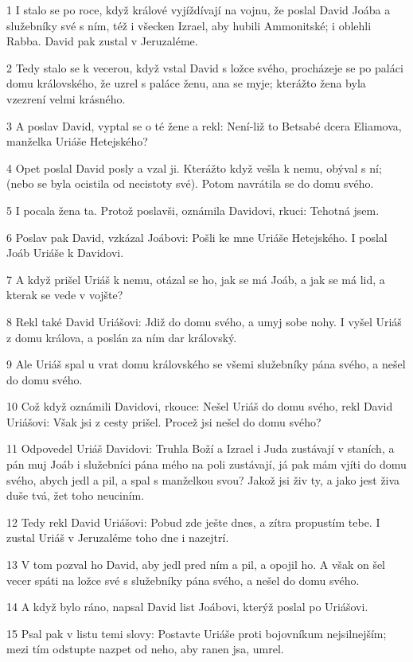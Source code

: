 \par 1 I stalo se po roce, když králové vyjíždívají na vojnu, že poslal David Joába a služebníky své s ním, též i všecken Izrael, aby hubili Ammonitské; i oblehli Rabba. David pak zustal v Jeruzaléme.
\par 2 Tedy stalo se k vecerou, když vstal David s ložce svého, procházeje se po paláci domu královského, že uzrel s paláce ženu, ana se myje; kterážto žena byla vzezrení velmi krásného.
\par 3 A poslav David, vyptal se o té žene a rekl: Není-liž to Betsabé dcera Eliamova, manželka Uriáše Hetejského?
\par 4 Opet poslal David posly a vzal ji. Kterážto když vešla k nemu, obýval s ní; (nebo se byla ocistila od necistoty své). Potom navrátila se do domu svého.
\par 5 I pocala žena ta. Protož poslavši, oznámila Davidovi, rkuci: Tehotná jsem.
\par 6 Poslav pak David, vzkázal Joábovi: Pošli ke mne Uriáše Hetejského. I poslal Joáb Uriáše k Davidovi.
\par 7 A když prišel Uriáš k nemu, otázal se ho, jak se má Joáb, a jak se má lid, a kterak se vede v vojšte?
\par 8 Rekl také David Uriášovi: Jdiž do domu svého, a umyj sobe nohy. I vyšel Uriáš z domu králova, a poslán za ním dar královský.
\par 9 Ale Uriáš spal u vrat domu královského se všemi služebníky pána svého, a nešel do domu svého.
\par 10 Což když oznámili Davidovi, rkouce: Nešel Uriáš do domu svého, rekl David Uriášovi: Však jsi z cesty prišel. Procež jsi nešel do domu svého?
\par 11 Odpovedel Uriáš Davidovi: Truhla Boží a Izrael i Juda zustávají v staních, a pán muj Joáb i služebníci pána mého na poli zustávají, já pak mám vjíti do domu svého, abych jedl a pil, a spal s manželkou svou? Jakož jsi živ ty, a jako jest živa duše tvá, žet toho neuciním.
\par 12 Tedy rekl David Uriášovi: Pobud zde ješte dnes, a zítra propustím tebe. I zustal Uriáš v Jeruzaléme toho dne i nazejtrí.
\par 13 V tom pozval ho David, aby jedl pred ním a pil, a opojil ho. A však on šel vecer spáti na ložce své s služebníky pána svého, a nešel do domu svého.
\par 14 A když bylo ráno, napsal David list Joábovi, kterýž poslal po Uriášovi.
\par 15 Psal pak v listu temi slovy: Postavte Uriáše proti bojovníkum nejsilnejším; mezi tím odstupte nazpet od neho, aby ranen jsa, umrel.
